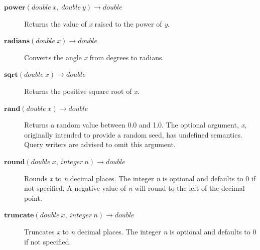 \documentclass[11pt,a4paper]{ivoa}
\begin{document}
\begin{description}
    \item[\texttt{$\textbf{power}(double\ x,\ double\ y) \to double$}]
    Returns the value of \textit{x} raised to the power of \textit{y}.
    
    \item[\texttt{$\textbf{radians}(double\ x) \to double$}]
    Converts the angle \textit{x} from degrees to radians.
    
    \item[\texttt{$\textbf{sqrt}(double\ x) \to double$}]
    Returns the positive square root of \textit{x}.
    
    \item[\texttt{$\textbf{rand}(double\ x) \to double$}]
    Returns a random value between 0.0 and 1.0.
    The optional argument, \textit{x}, originally intended to provide a
    random seed, has undefined semantics. Query writers are advised to omit
    this argument.
    
    \item[\texttt{$\textbf{round}(double\ x,\ integer\ n) \to double$}]
    Rounds \textit{x} to \textit{n} decimal places.
    The integer \textit{n} is optional and defaults to 0 if not specified.
    A negative value of \textit{n} will round to the left of the decimal
    point.
    
    \item[\texttt{$\textbf{truncate}(double\ x,\ integer\ n) \to double$}]
    Truncates \textit{x} to \textit{n} decimal places.
    The integer \textit{n} is optional and defaults to 0 if not specified.
\end{description}
\end{document}
